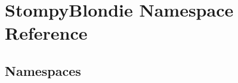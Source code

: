 \hypertarget{namespace_stompy_blondie}{}\section{Stompy\+Blondie Namespace Reference}
\label{namespace_stompy_blondie}
\subsection*{Namespaces}
\begin{DoxyCompactItemize}
\end{DoxyCompactItemize}
